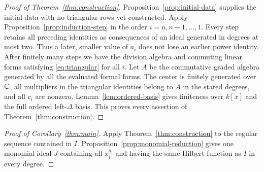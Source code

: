 \begin{proof}[Proof of Theorem~\ref{thm:construction}]
Proposition~\ref{prop:initial-data} supplies the initial data with no
triangular rows yet constructed.
Apply Proposition~\ref{prop:induction-step} in the order
\(i=n,n-1,\ldots,1\).
Every step retains all preceding identities as consequences of an ideal
generated in degrees at most two.  Thus a later, smaller value of \(a_i\)
does not lose an earlier power identity.
After finitely many steps we have the division algebra and commuting
linear forms satisfying \eqref{eq:triangular} for all \(i\).
Let \(A\) be the commutative graded algebra generated by all the evaluated
formal forms. The center is
finitely generated over \(\mathbb C\), all multipliers in the triangular
identities belong to \(A\) in the stated degrees, and all \(c_i\) are
nonzero. Lemma~\ref{lem:ordered-basis} gives finiteness over \(k[x]\)
and the full ordered left-\(\Delta\) basis. This proves every assertion
of Theorem~\ref{thm:construction}.
\end{proof}

\begin{proof}[Proof of Corollary~\ref{thm:main}]
Apply Theorem~\ref{thm:construction} to the regular sequence contained
in \(I\). Proposition~\ref{prop:monomial-reduction} gives one monomial
ideal \(J\) containing all \(x_i^{a_i}\) and having the same Hilbert
function as \(I\) in every degree.
\end{proof}
